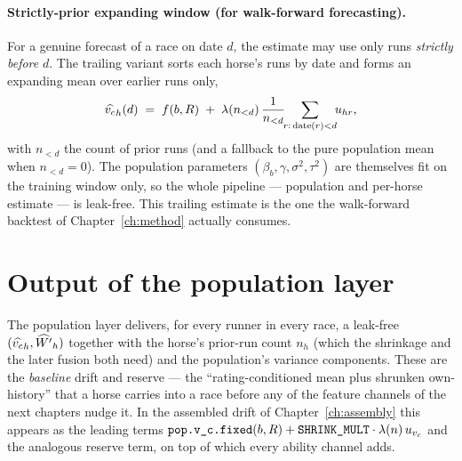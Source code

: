 \paragraph{Strictly-prior expanding window (for walk-forward forecasting).} For a genuine
forecast of a race on date $d$, the estimate may use only runs \emph{strictly before} $d$. The
trailing variant sorts each horse's runs by date and forms an expanding mean over earlier runs
only,
\begin{equation}
  \widehat{{v_{c}}}_h(d) \;=\; f(b,R) \;+\; \lambda(n_{<d})\,
   \frac{1}{n_{<d}}\!\!\sum_{r:\,\text{date}(r)<d}\!\! u_{hr},
  \label{eq:trailing}
\end{equation}
with $n_{<d}$ the count of prior runs (and a fallback to the pure population mean when
$n_{<d}=0$). The population parameters $(\beta_b,\gamma,\sigma^2,\tau^2)$ are themselves fit on the
training window only, so the whole pipeline --- population and per-horse estimate --- is leak-free.
This trailing estimate is the one the walk-forward backtest of Chapter~\ref{ch:method} actually
consumes.

\section{Output of the population layer}

The population layer delivers, for every runner in every race, a leak-free
$(\widehat{{v_{c}}}_h,\widehat{{W^{\prime}}}_h)$ together with the horse's prior-run count $n_h$ (which the
shrinkage and the later fusion both need) and the population's variance components. These are the
\emph{baseline} drift and reserve --- the ``rating-conditioned mean plus shrunken own-history''
that a horse carries into a race before any of the feature channels of the next chapters nudge it.
In the assembled drift of Chapter~\ref{ch:assembly} this appears as the leading terms
$\texttt{pop.v\_c.fixed}(b,R) + \texttt{SHRINK\_MULT}\cdot\lambda(n)\,u_{{v_{c}}}$ and the analogous
reserve term, on top of which every ability channel adds.
